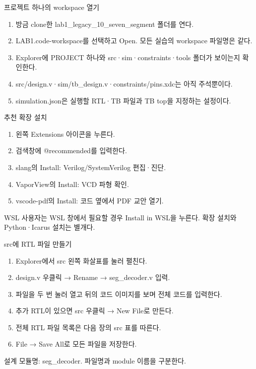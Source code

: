 \begin{frame}{프로젝트 하나의 workspace 열기}\relax
\small
\begin{enumerate}\setlength{\itemsep}{0.22cm}
\item 방금 clone한 lab1\_legacy\_10\_seven\_segment 폴더를 연다.
\item LAB1.code-workspace를 선택하고 Open. 모든 실습의 workspace 파일명은 같다.
\item Explorer에 PROJECT 하나와 src·sim·constraints·tools 폴더가 보이는지 확인한다.
\item src/design.v·sim/tb\_design.v·constraints/pins.xdc는 아직 주석뿐이다.
\item simulation.json은 실행할 RTL·TB 파일과 TB top을 지정하는 설정이다.
\end{enumerate}

\end{frame}

\begin{frame}{추천 확장 설치}\relax
\small
\begin{enumerate}\setlength{\itemsep}{0.22cm}
\item 왼쪽 Extensions 아이콘을 누른다.
\item 검색창에 @recommended를 입력한다.
\item slang의 Install: Verilog/SystemVerilog 편집·진단.
\item VaporView의 Install: VCD 파형 확인.
\item vscode-pdf의 Install: 코드 옆에서 PDF 교안 열기.
\end{enumerate}
WSL 사용자는 WSL 창에서 필요할 경우 Install in WSL을 누른다. 확장 설치와 Python·Icarus 설치는 별개다.\par
\end{frame}

\begin{frame}{src에 RTL 파일 만들기}\relax
\small
\begin{enumerate}\setlength{\itemsep}{0.22cm}
\item Explorer에서 src 왼쪽 화살표를 눌러 펼친다.
\item design.v 우클릭 → Rename → seg\_decoder.v 입력.
\item 파일을 두 번 눌러 열고 뒤의 코드 이미지를 보며 전체 코드를 입력한다.
\item 추가 RTL이 있으면 src 우클릭 → New File로 만든다.
\item 전체 RTL 파일 목록은 다음 장의 src 표를 따른다.
\item File → Save All로 모든 파일을 저장한다.
\end{enumerate}
설계 모듈명: seg\_decoder. 파일명과 module 이름을 구분한다.\par
\end{frame}

